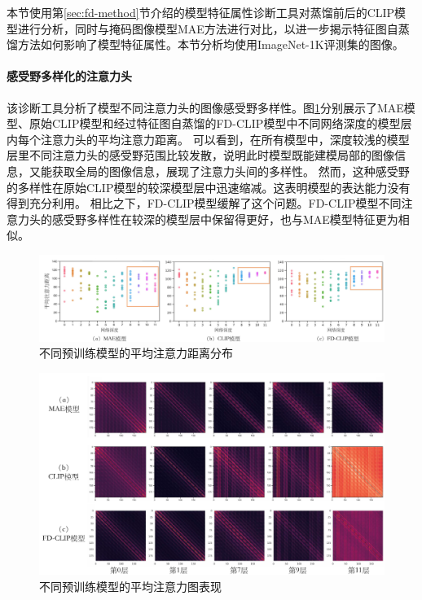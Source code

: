 本节使用第\ref{sec:fd-method}节介绍的模型特征属性诊断工具对蒸馏前后的CLIP模型进行分析，同时与掩码图像模型MAE方法进行对比，以进一步揭示特征图自蒸馏方法如何影响了模型特征属性。本节分析均使用ImageNet-1K评测集的图像。
\paragraph{感受野多样化的注意力头} 该诊断工具分析了模型不同注意力头的图像感受野多样性。图\ref{fig:fd-attn-distance}分别展示了MAE模型、原始CLIP模型和经过特征图自蒸馏的FD-CLIP模型中不同网络深度的模型层内每个注意力头的平均注意力距离。
可以看到，在所有模型中，深度较浅的模型层里不同注意力头的感受野范围比较发散，说明此时模型既能建模局部的图像信息，又能获取全局的图像信息，展现了注意力头间的多样性。
然而，这种感受野的多样性在原始CLIP模型的较深模型层中迅速缩减。这表明模型的表达能力没有得到充分利用\cite{xie2023revealing}。
相比之下，FD-CLIP模型缓解了这个问题。FD-CLIP模型不同注意力头的感受野多样性在较深的模型层中保留得更好，也与MAE模型特征更为相似。%


\begin{figure}
  \centering
  \includegraphics[width=1.0\linewidth]{figures/fd-attn-distance.pdf}
  \caption{不同预训练模型的平均注意力距离分布}
  \label{fig:fd-attn-distance}
\end{figure}

\begin{figure}
  \centering
  \includegraphics[width=1.0\linewidth]{figures/fd-attn-map.pdf}
  \caption{不同预训练模型的平均注意力图表现}
  \label{fig:fd-attn-map}
\end{figure}

